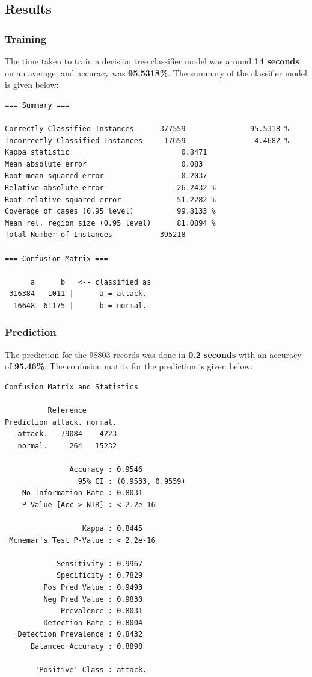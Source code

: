 \documentclass[11pt]{article}
\begin{document}
\subsection{Results}
\subsubsection{Training}

The time taken to train a decision tree classifier model was around {\bf 14 seconds} on an average, and accuracy was {\bf 95.5318\%}. The summary of the classifier model is given below:

\begin{Verbatim}[fontsize=\small]
=== Summary ===

Correctly Classified Instances      377559               95.5318 %
Incorrectly Classified Instances     17659                4.4682 %
Kappa statistic                          0.8471
Mean absolute error                      0.083 
Root mean squared error                  0.2037
Relative absolute error                 26.2432 %
Root relative squared error             51.2282 %
Coverage of cases (0.95 level)          99.8133 %
Mean rel. region size (0.95 level)      81.0894 %
Total Number of Instances           395218     

=== Confusion Matrix ===

      a      b   <-- classified as
 316384   1011 |      a = attack.
  16648  61175 |      b = normal.
\end{Verbatim}

\subsubsection{Prediction}
The prediction for the 98803 records was done in {\bf 0.2 seconds} with an accuracy of {\bf 95.46\%}. The confusion matrix for the prediction is given below:

\begin{Verbatim}[fontsize=\small]
Confusion Matrix and Statistics

          Reference
Prediction attack. normal.
   attack.   79084    4223
   normal.     264   15232
                                          
               Accuracy : 0.9546          
                 95% CI : (0.9533, 0.9559)
    No Information Rate : 0.8031          
    P-Value [Acc > NIR] : < 2.2e-16       
                                          
                  Kappa : 0.8445          
 Mcnemar's Test P-Value : < 2.2e-16       
                                          
            Sensitivity : 0.9967          
            Specificity : 0.7829          
         Pos Pred Value : 0.9493          
         Neg Pred Value : 0.9830          
             Prevalence : 0.8031          
         Detection Rate : 0.8004          
   Detection Prevalence : 0.8432          
      Balanced Accuracy : 0.8898          
                                          
       'Positive' Class : attack.  
\end{Verbatim}      
\end{document}
